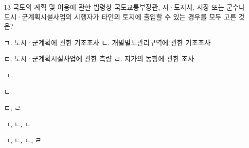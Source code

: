 \begin{question}{13}
국토의 계획 및 이용에 관한 법령상 국토교통부장관, 시·도지사, 시장 또는 군수나 도시·군계획시설사업의 시행자가 타인의 토지에 출입할 수 있는 경우를 모두 고른 것은?
\begin{framedtext}
ㄱ. 도시·군계획에 관한 기초조사 \hfill ㄴ. 개발밀도관리구역에 관한 기초조사 \par
ㄷ. 도시·군계획시설사업에 관한 측량 \hfill ㄹ. 지가의 동향에 관한 조사 \par
\end{framedtext}
\begin{choices}
  \item ㄱ
  \item ㄴ
  \item ㄷ, ㄹ
  \item ㄱ, ㄴ, ㄷ
  \item ㄱ, ㄴ, ㄷ, ㄹ
\end{choices}
\end{question}

